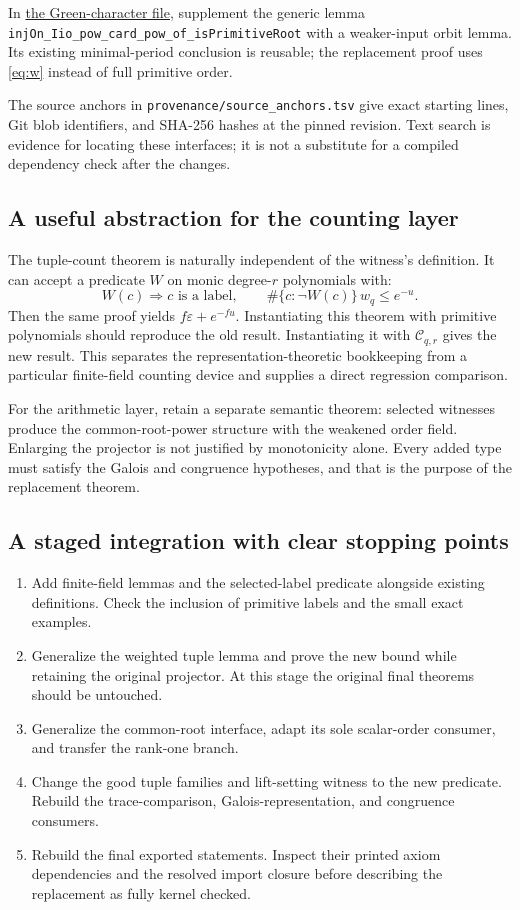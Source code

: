 \documentclass[11pt,a4paper]{article}
\theoremstyle{definition}
\theoremstyle{remark}
\newcommand{\labels}{\mathcal C}
\newcommand{\code}[1]{{\small\nolinkurl{#1}}}
\newcommand{\src}[2]{\href{https://github.com/VladimirReshetnikov/ProveIt/blob/89d12dd40424f1217fd818d84877b3da52396a3b/Analysis/GeneralizedRiemannHypothesis/Lean/grh/src/#1.lean}{#2}}
\begin{document}
In \src{Lib/LocalGL/Green/LabelCharacters}{the Green-character file}, supplement the
generic lemma \code{injOn_Iio_pow_card_pow_of_isPrimitiveRoot}
with a weaker-input orbit lemma.
Its existing minimal-period conclusion is reusable; the replacement proof uses
\eqref{eq:w} instead of full primitive order.

The source anchors in \code{provenance/source_anchors.tsv} give exact starting lines,
Git blob identifiers, and SHA-256 hashes at the pinned revision. Text search is
evidence for locating these interfaces; it is not a substitute for a compiled
dependency check after the changes.

\subsection{A useful abstraction for the counting layer}

The tuple-count theorem is naturally independent of the witness's definition.
It can accept a predicate \(W\) on monic degree-\(r\) polynomials with:
\[
 W(c)\Longrightarrow\text{\(c\) is a label},\qquad
 \#\{c:\neg W(c)\}\,w_q\le e^{-u}.
\]
Then the same proof yields \(f\varepsilon+e^{-fu}\).
Instantiating this theorem with primitive polynomials should reproduce the old
result. Instantiating it with \(\labels_{q,r}\) gives the new result.
This separates the representation-theoretic bookkeeping from a particular
finite-field counting device and supplies a direct regression comparison.

For the arithmetic layer, retain a separate semantic theorem:
selected witnesses produce the common-root-power structure with the weakened
order field. Enlarging the projector is not justified by monotonicity alone.
Every added type must satisfy the Galois and congruence hypotheses, and that is
the purpose of the replacement theorem.

\subsection{A staged integration with clear stopping points}

\begin{enumerate}
\item Add finite-field lemmas and the selected-label predicate alongside existing
definitions. Check the inclusion of primitive labels and the small exact examples.
\item Generalize the weighted tuple lemma and prove the new bound while retaining
the original projector. At this stage the original final theorems should be untouched.
\item Generalize the common-root interface, adapt its sole scalar-order consumer,
and transfer the rank-one branch.
\item Change the good tuple families and lift-setting witness to the new predicate.
Rebuild the trace-comparison, Galois-representation, and congruence consumers.
\item Rebuild the final exported statements. Inspect their printed axiom dependencies
and the resolved import closure before describing the replacement as fully
kernel checked.
\end{enumerate}
\end{document}
